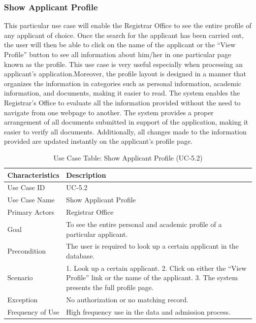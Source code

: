 \subsubsection{Show Applicant Profile}
This particular use case will enable the Registrar Office to see the entire profile of any applicant of choice. Once the search for the applicant has been carried out, the user will then be able to click on the name of the applicant or the “View Profile” button to see all information about him/her in one particular page known as the profile. This use case is very useful especially when processing an applicant’s application.Moreover, the profile layout is designed in a manner that organizes the information in categories such as personal information, academic information, and documents, making it easier to read. The system enables the Registrar’s Office to evaluate all the information provided without the need to navigate from one webpage to another. The system provides a proper arrangement of all documents submitted in support of the application, making it easier to verify all documents. Additionally, all changes made to the information provided are updated instantly on the applicant’s profile page.
\begin{table}[H]
    \centering
    \small
    \renewcommand{\arraystretch}{1.4}
    \caption{Use Case Table: Show Applicant Profile (UC-5.2)} %
    \label{tab:show-applicant-profile-registrar}
    \begin{tabularx}{\textwidth}{|l|X|}
        \hline
        \rowcolor[gray]{0.9} {Characteristics} & {Description} \\ \hline
        Use Case ID & UC-5.2 \\ \hline
        Use Case Name & Show Applicant Profile \\ \hline
        Primary Actors & Registrar Office \\ \hline
        Goal & To see the entire personal and academic profile of a particular applicant. \\ \hline
        Precondition & The user is required to look up a certain applicant in the database. \\ \hline
        Scenario & 1. Look up a certain applicant. 2. Click on either the “View Profile” link or the name of the applicant. 3. The system presents the full profile page. \\ \hline
        Exception & No authorization or no matching record. \\ \hline
        Frequency of Use & High frequency use in the data and admission process. \\ \hline
    \end{tabularx}
\end{table}
\FloatBarrier